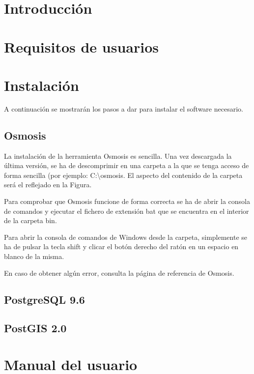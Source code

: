 
\section{Introducción}

\section{Requisitos de usuarios}

\section{Instalación}
A continuación se mostrarán los pasos a dar para instalar el software necesario.

\subsection{Osmosis}
La instalación de la herramienta Osmosis es sencilla. Una vez descargada la última versión, se ha de descomprimir en una carpeta a la que se tenga acceso de forma sencilla (por ejemplo: C:\textbackslash{}osmosis.
El aspecto del contenido de la carpeta será el reflejado en la Figura.

Para comprobar que Osmosis funcione de forma correcta se ha de abrir la consola de comandos y ejecutar el fichero de extensión bat que se encuentra en el interior de la carpeta bin.

Para abrir la consola de comandos de Windows desde la carpeta, simplemente se ha de pulsar la tecla shift y clicar el botón derecho del ratón en un espacio en blanco de la misma.

En caso de obtener algún error, consulta la página de referencia de Osmosis.

\subsection{PostgreSQL 9.6}

\subsection{PostGIS 2.0}



\section{Manual del usuario}

